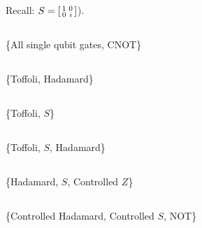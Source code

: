 \documentclass[11pt]{article}
\begin{document}
\noindent Recall: $S = \begin{bsmallmatrix}
	1 & 0\\0 & i
\end{bsmallmatrix}$).

\subsection{} \{All single qubit gates, CNOT\}



\subsection{} \{Toffoli, Hadamard\}



\subsection{} \{Toffoli, $S$\}



\subsection{} \{Toffoli, $S$, Hadamard\}



\subsection{} \{Hadamard, $S$, Controlled $Z$\}



\subsection{} \{Controlled Hadamard, Controlled $S$, NOT\} 
\end{document}
